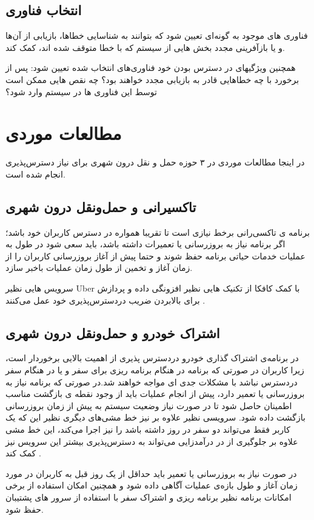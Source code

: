 \subsection{انتخاب فناوری}
فناوری های موجود به گونه‌ای تعیین شود که بتوانند به شناسایی خطا‌ها، بازیابی از آن‌ها و یا بازآفرینی مجدد بخش هایی از سیستم که با خطا متوقف شده اند، کمک کند.

همچنین ویژگیهای در دسترس بودن خود فناوری‌های انتخاب شده تعیین شود: پس از برخورد با چه خطا‌هایی قادر به بازیابی مجدد خواهند بود؟ چه نقص هایی ممکن است توسط این فناوری ها در سیستم وارد شود؟


\section{مطالعات موردی}

در اینجا مطالعات موردی در ۳ حوزه حمل و نقل درون شهری برای نیاز دسترس‌پذیری انجام شده است. 
\subsection{تاکسیرانی و حمل‌و‌نقل درون شهری}
برنامه ی تاکسی‌رانی برخط نیازی است تا تقریبا همواره در دسترس کاربران خود باشد؛ اگر برنامه نیاز به بروز‌رسانی یا تعمیرات داشته باشد، باید سعی شود در طول به عملیات خدمات حیاتی برنامه حفظ شوند و حتما پیش از آغاز بروزرسانی کاربران را از زمان آغاز و تخمین از طول زمان عملیات باخبر سازد.

سرویس هایی نظیر Uber با کمک کافکا از تکنیک هایی نظیر افزونگی داده و پردازش برای بالابردن ضریب دردسترس‌پذیری خود عمل می‌کنند \cite{uber_kafka}.
\subsection{اشتراک خودرو و حمل‌و‌نقل درون شهری}
در برنامه‌ی اشتراک گذاری خودرو دردسترس پذیری از اهمیت بالایی برخوردار است، زیرا کاربران در صورتی که برنامه در هنگام برنامه ریزی برای سفر و یا در هنگام سفر دردسترس نباشد با مشکلات جدی ای مواجه خواهند شد.در صورتی که برنامه نیاز به بروزرسانی یا تعمیر دارد، پیش از انجام عملیات باید از وجود نقطه ی بازگشت مناسب اطمینان حاصل شود تا در صورت نیاز وضعیت سیستم به پیش از زمان بروزرسانی بازگشت داده شود. سرویسی نظیر  علاوه بر نیز خط مشی‌های دیگری نظیر این که یک کاربر فقط می‌تواند دو سفر در روز داشته باشد را نیز اجرا می‌کند، این خط مشی علاوه بر جلوگیری از در درآمدزایی می‌تواند به دسترس‌پذیری بیشتر این سرویس نیز کمک کند  \cite{waze_two_days}.

در صورت نیاز به بروزرسانی یا تعمیر باید حداقل از یک روز قبل به کاربران در مورد زمان آغاز و طول بازه‌ی عملیات آگاهی  داده شود و همچنین امکان استفاده از برخی امکانات برنامه نظیر برنامه ریزی و اشتراک سفر با استفاده از سرور های پشتیبان حفظ شود.
